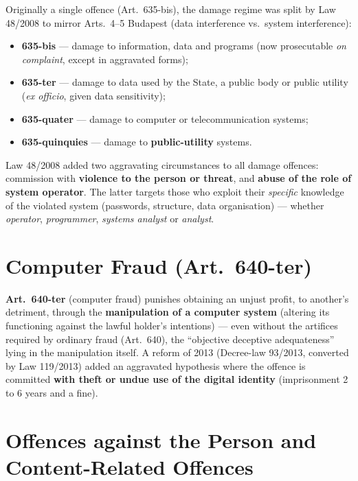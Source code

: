 \documentclass[11pt,a4paper,openany]{report}
\theoremstyle{definition}
\theoremstyle{plain}
\theoremstyle{remark}
\begin{document}
Originally a single offence (Art.\ 635-bis), the damage regime was split by Law 48/2008 to mirror Arts.\ 4--5 Budapest (data interference vs.\ system interference):
\begin{itemize}
    \item \textbf{635-bis} --- damage to information, data and programs (now prosecutable \emph{on complaint}, except in aggravated forms);
    \item \textbf{635-ter} --- damage to data used by the State, a public body or public utility (\emph{ex officio}, given data sensitivity);
    \item \textbf{635-quater} --- damage to computer or telecommunication systems;
    \item \textbf{635-quinquies} --- damage to \textbf{public-utility} systems.
\end{itemize}
Law 48/2008 added two aggravating circumstances to all damage offences: commission with \textbf{violence to the person or threat}, and \textbf{abuse of the role of system operator}. The latter targets those who exploit their \emph{specific} knowledge of the violated system (passwords, structure, data organisation) --- whether \emph{operator}, \emph{programmer}, \emph{systems analyst} or \emph{analyst}.

\section{Computer Fraud (Art.\ 640-ter)}

\textbf{Art.\ 640-ter} (computer fraud) punishes obtaining an unjust profit, to another's detriment, through the \textbf{manipulation of a computer system} (altering its functioning against the lawful holder's intentions) --- even without the artifices required by ordinary fraud (Art.\ 640), the ``objective deceptive adequateness'' lying in the manipulation itself. A reform of 2013 (Decree-law 93/2013, converted by Law 119/2013) added an aggravated hypothesis where the offence is committed \textbf{with theft or undue use of the digital identity} (imprisonment 2 to 6 years and a fine).

\section{Offences against the Person and Content-Related Offences}
\end{document}
